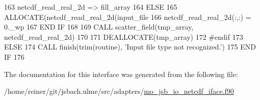 \begin{DoxyCode}
163         netcdf\_read\_real\_2d => fill\_array
164       \textcolor{keywordflow}{ELSE}
165         \textcolor{keyword}{ALLOCATE}(netcdf\_read\_real\_2d(input\_file%
166         netcdf\_read\_real\_2d(:,:) = 0.\_wp
167 \textcolor{keywordflow}{      END IF}
168 
169       \textcolor{keyword}{CALL }scatter\_field(tmp\_array, netcdf\_read\_real\_2d)
170 
171       \textcolor{keyword}{DEALLOCATE}(tmp\_array)
172 \textcolor{preprocessor}{#endif}
173 \textcolor{preprocessor}{}    \textcolor{keywordflow}{ELSE}
174       \textcolor{keyword}{CALL }finish(trim(routine), \textcolor{stringliteral}{'Input file type not recognized.'})
175 \textcolor{keywordflow}{    END IF}
176 
\end{DoxyCode}


The documentation for this interface was generated from the following file\+:\begin{DoxyCompactItemize}
\item 
/home/reiner/git/jsbach.\+ulme/src/adapters/\hyperlink{mo__jsb__io__netcdf__iface_8f90}{mo\+\_\+jsb\+\_\+io\+\_\+netcdf\+\_\+iface.\+f90}\end{DoxyCompactItemize}
